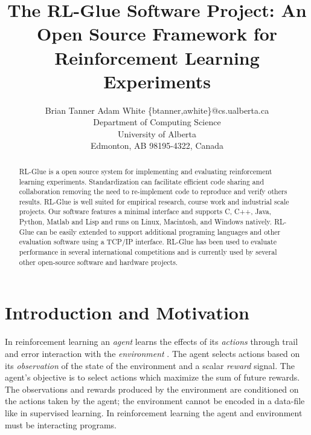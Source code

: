\documentclass[twopage,11pt]{article}
\begin{document}
\title{The RL-Glue Software Project: An Open Source Framework for Reinforcement Learning Experiments}

\author{\name Brian Tanner \AND Adam White  \email \{btanner,awhite\}@cs.ualberta.ca \\
       \addr Department of Computing Science\\
       University of Alberta\\
       Edmonton, AB 98195-4322, Canada}


\maketitle

\begin{abstract}
RL-Glue is a open source system for implementing and evaluating reinforcement learning experiments. Standardization can facilitate efficient code sharing and collaboration removing the need to re-implement code to reproduce and verify others results.  RL-Glue is well suited for empirical research, course work and industrial scale projects. Our software features a minimal interface and supports C, C++, Java, Python, Matlab and Lisp and runs on Linux, Macintosh, and Windows natively. RL-Glue can be easily extended to support additional programing languages and other evaluation software using a TCP/IP interface. RL-Glue has been used to evaluate performance in several international competitions and is currently used by several other open-source software and hardware projects.
\end{abstract}

\section{Introduction and Motivation}
In reinforcement learning an {\it agent} learns the effects of its {\it actions} through trail and error interaction with the {\it environment} \cite{rlbook, rlsurvey,ndp}. The agent selects actions based on its {\it observation} of the state of the environment and a scalar {\it reward} signal. The agent's objective is to select actions which maximize the sum of future rewards. The observations and rewards produced by the environment are conditioned on the actions taken by the agent; the environment cannot be encoded in a data-file like in supervised learning. In reinforcement learning the agent and environment must be interacting programs. 
\end{document}
